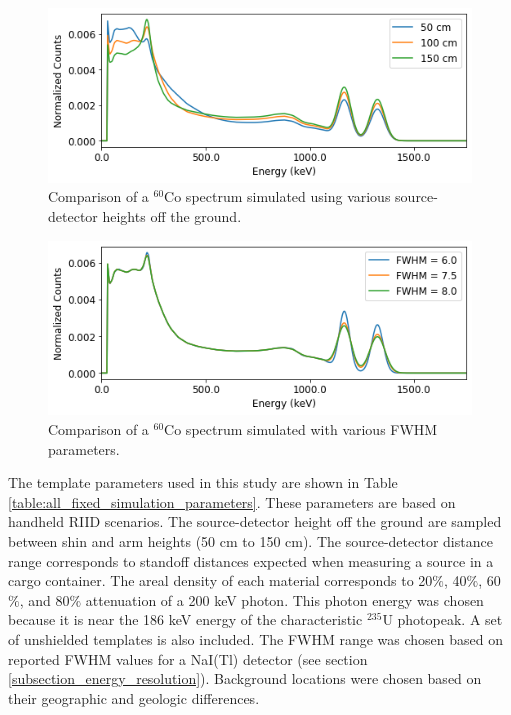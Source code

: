 \begin{figure}[H]
\centering
\includegraphics[width=0.75\linewidth]{images/sim_spectra_height_comparison}
\caption{Comparison of a $^{60}$Co spectrum simulated using various source-detector heights off the ground.}
\label{fig:sim_spectra_height_comparison}
\end{figure}


\begin{figure}[H]
\centering
\includegraphics[width=0.75\linewidth]{images/sim_spectra_FWHM_comparison}
\caption{Comparison of a $^{60}$Co spectrum simulated with various FWHM parameters.}
\label{fig:sim_spectra_FWHM_comparison}
\end{figure}






The template parameters used in this study are shown in Table \ref{table:all_fixed_simulation_parameters}. These parameters are based on handheld RIID scenarios. The source-detector height off the ground are sampled between shin and arm heights (50 cm to 150 cm). The source-detector distance range corresponds to standoff distances expected when measuring a source in a cargo container. The areal density of each material corresponds to 20$\%$, 40$\%$, 60$\%$, and 80$\%$ attenuation of a 200 keV photon. This photon energy was chosen because it is near the 186 keV energy of the characteristic $^{235}$U photopeak. A set of unshielded templates is also included. The FWHM range was chosen based on reported FWHM values for a NaI(Tl) detector (see section \ref{subsection_energy_resolution}). Background locations were chosen based on their geographic and geologic differences.


